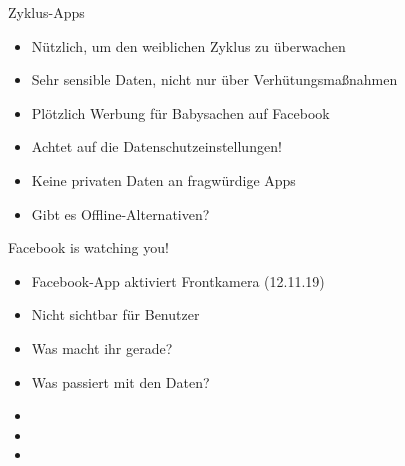 \documentclass[10pt]{beamer}
\begin{document}
%
%
\begin{frame}[fragile]{Zyklus-Apps}
\begin{itemize}
    \item Nützlich, um den weiblichen Zyklus zu überwachen
    
    \item Sehr sensible Daten, nicht nur über Verhütungsmaßnahmen
    \item Plötzlich Werbung für Babysachen auf Facebook
    
    \item \alert{Achtet auf die Datenschutzeinstellungen!}
    \item \alert{Keine privaten Daten an fragwürdige Apps}
    \item Gibt es Offline-Alternativen?
\end{itemize}
\end{frame}

%
%
\begin{frame}[fragile]{Facebook is watching you!}
\begin{itemize}
    \item Facebook-App aktiviert Frontkamera (12.11.19)
    \item Nicht sichtbar für Benutzer
    \item Was macht ihr gerade?
    \item Was passiert mit den Daten?
    \item[]
    \item[]
    \item[]
  \end{itemize}
\end{frame}
\end{document}
